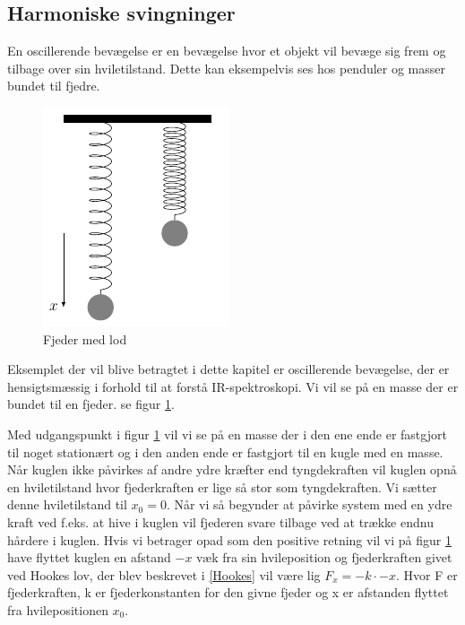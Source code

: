 \subsection{Harmoniske svingninger}\label{teori: Harmoniske svingninger}
En oscillerende bevægelse er en bevægelse hvor et objekt vil bevæge sig frem og tilbage over sin hviletilstand. Dette kan eksempelvis ses hos penduler og masser bundet til fjedre.
\\

\begin{figure}
\centering
\includegraphics[scale=1]{Billeder/fjeder}
\caption{Fjeder med lod \label{fig:fjeder}}
\end{figure} 

Eksemplet der vil blive betragtet i dette kapitel er oscillerende bevægelse, der er hensigtsmæssig i forhold til at forstå IR-spektroskopi. Vi vil se på en masse der er bundet til en fjeder. se figur \ref{fig:fjeder}.

Med udgangspunkt i figur \ref{fig:fjeder} vil vi se på en masse der i den ene ende er fastgjort til noget stationært og i den anden ende er fastgjort til en kugle med en masse. Når kuglen ikke påvirkes af andre ydre kræfter end tyngdekraften vil kuglen opnå en hviletilstand hvor fjederkraften er lige så stor som tyngdekraften. Vi sætter denne hviletilstand til $x_0=0$. Når vi så begynder at påvirke system med en ydre kraft ved f.eks. at hive i kuglen vil fjederen svare tilbage ved at trække endnu hårdere i kuglen. Hvis vi betrager opad som den positive retning vil vi på figur \ref{fig:fjeder} have flyttet kuglen en afstand $-x$ væk fra sin hvileposition og fjederkraften givet ved Hookes lov, der blev beskrevet i \ref{Hookes} vil være lig $F_x=-k \cdot -x$. Hvor F er fjederkraften, k er fjederkonstanten for den givne fjeder og x er afstanden flyttet fra hvilepositionen $x_0$.